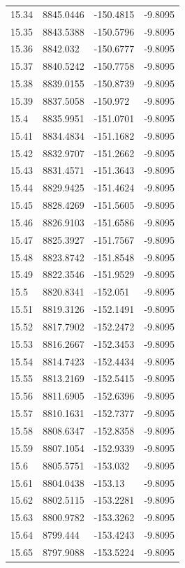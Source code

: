 \begin{table}[H]
\begin{tabular}{llll}
15.34 & 8845.0446 & -150.4815 & -9.8095 \\
15.35 & 8843.5388 & -150.5796 & -9.8095 \\
15.36 & 8842.032 & -150.6777 & -9.8095 \\
15.37 & 8840.5242 & -150.7758 & -9.8095 \\
15.38 & 8839.0155 & -150.8739 & -9.8095 \\
15.39 & 8837.5058 & -150.972 & -9.8095 \\
15.4 & 8835.9951 & -151.0701 & -9.8095 \\
15.41 & 8834.4834 & -151.1682 & -9.8095 \\
15.42 & 8832.9707 & -151.2662 & -9.8095 \\
15.43 & 8831.4571 & -151.3643 & -9.8095 \\
15.44 & 8829.9425 & -151.4624 & -9.8095 \\
15.45 & 8828.4269 & -151.5605 & -9.8095 \\
15.46 & 8826.9103 & -151.6586 & -9.8095 \\
15.47 & 8825.3927 & -151.7567 & -9.8095 \\
15.48 & 8823.8742 & -151.8548 & -9.8095 \\
15.49 & 8822.3546 & -151.9529 & -9.8095 \\
15.5 & 8820.8341 & -152.051 & -9.8095 \\
15.51 & 8819.3126 & -152.1491 & -9.8095 \\
15.52 & 8817.7902 & -152.2472 & -9.8095 \\
15.53 & 8816.2667 & -152.3453 & -9.8095 \\
15.54 & 8814.7423 & -152.4434 & -9.8095 \\
15.55 & 8813.2169 & -152.5415 & -9.8095 \\
15.56 & 8811.6905 & -152.6396 & -9.8095 \\
15.57 & 8810.1631 & -152.7377 & -9.8095 \\
15.58 & 8808.6347 & -152.8358 & -9.8095 \\
15.59 & 8807.1054 & -152.9339 & -9.8095 \\
15.6 & 8805.5751 & -153.032 & -9.8095 \\
15.61 & 8804.0438 & -153.13 & -9.8095 \\
15.62 & 8802.5115 & -153.2281 & -9.8095 \\
15.63 & 8800.9782 & -153.3262 & -9.8095 \\
15.64 & 8799.444 & -153.4243 & -9.8095 \\
15.65 & 8797.9088 & -153.5224 & -9.8095 \\

\end{tabular}
\end{table}
